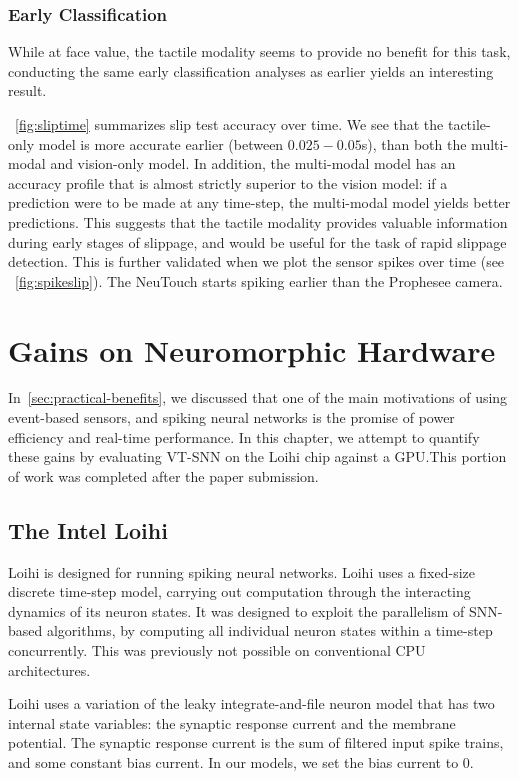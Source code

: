 \documentclass[fyp]{socreport}
\begin{document}
\subsection{Early Classification}

While at face value, the tactile modality seems to provide no benefit for this
task, conducting the same early classification analyses as earlier yields an
interesting result.

~\autoref{fig:sliptime} summarizes slip test accuracy over time. We see that the
tactile-only model is more accurate earlier (between $0.025 - 0.05$s), than both
the multi-modal and vision-only model. In addition, the multi-modal model has an
accuracy profile that is almost strictly superior to the vision model: if a
prediction were to be made at any time-step, the multi-modal model yields better
predictions. This suggests that the tactile modality provides valuable
information during early stages of slippage, and would be useful for the task of
rapid slippage detection. This is further validated when we plot the sensor
spikes over time (see ~\autoref{fig:spikeslip}). The NeuTouch starts spiking
earlier than the Prophesee camera.

\chapter{Gains on Neuromorphic Hardware\label{cha:neuromorphic}}

In~\autoref{sec:practical-benefits}, we discussed that one of the main
motivations of using event-based sensors, and spiking neural networks is the
promise of power efficiency and real-time performance. In this chapter, we
attempt to quantify these gains by evaluating VT-SNN on the Loihi chip against a
GPU.\@ This portion of work was completed after the paper submission.

\section{The Intel Loihi}

Loihi is designed for running spiking neural networks. Loihi uses a fixed-size
discrete time-step model, carrying out computation through the interacting
dynamics of its neuron states. It was designed to exploit the parallelism of
SNN-based algorithms, by computing all individual neuron states within a
time-step concurrently. This was previously not possible on conventional CPU
architectures.

Loihi uses a variation of the leaky integrate-and-file neuron model that has two
internal state variables: the synaptic response current and the membrane
potential. The synaptic response current is the sum of filtered input spike
trains, and some constant bias current. In our models, we set the bias current
to 0.
\end{document}
